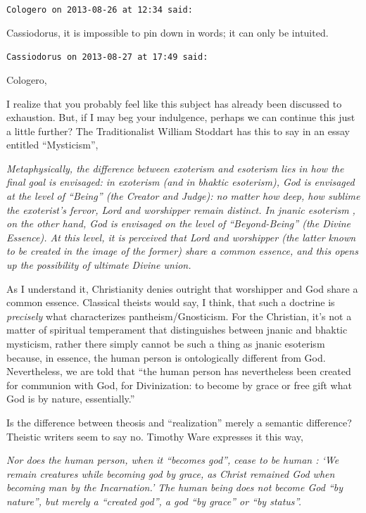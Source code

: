 \begin{footnotesize}
\begin{sffamily}
\hfill

\texttt{Cologero on 2013-08-26 at 12:34 said:}

Cassiodorus, it is impossible to pin down in words; it can only be intuited.

\hfill

\texttt{Cassiodorus on 2013-08-27 at 17:49 said:}

Cologero,

I realize that you probably feel like this subject has already been discussed to exhaustion. But, if I may beg your indulgence, perhaps we can continue this just a little further? The Traditionalist William Stoddart has this to say in an essay entitled ``Mysticism'',

\emph{Metaphysically, the difference between exoterism and esoterism lies in how the final goal is envisaged: in exoterism (and in bhaktic esoterism), God is envisaged at the level of ``Being'' (the Creator and Judge): no matter how deep, how sublime the exoterist's fervor, Lord and worshipper remain distinct. In jnanic esoterism , on the other hand, God is envisaged on the level of ``Beyond-Being'' (the Divine Essence). At this level, it is perceived that Lord and worshipper (the latter known to be created in the image of the former) share a common essence, and this opens up the possibility of ultimate Divine union.}

As I understand it, Christianity denies outright that worshipper and God share a common essence. Classical theists would say, I think, that such a doctrine is \emph{precisely} what characterizes pantheism/Gnosticism. For the Christian, it's not a matter of spiritual temperament that distinguishes between jnanic and bhaktic mysticism, rather there simply cannot be such a thing as jnanic esoterism because, in essence, the human person is ontologically different from God. Nevertheless, we are told that ``the human person has nevertheless been created for communion with God, for Divinization: to become by grace or free gift what God is by nature, essentially.''

Is the difference between theosis and ``realization'' merely a semantic difference? Theistic writers seem to say no. Timothy Ware expresses it this way,

\emph{Nor does the human person, when it ``becomes god'', cease to be human : `We remain creatures while becoming god by grace, as Christ remained God when becoming man by the Incarnation.' The human being does not become God ``by nature'', but merely a ``created god'', a god ``by grace'' or ``by status''.}


\end{sffamily}
\end{footnotesize}
